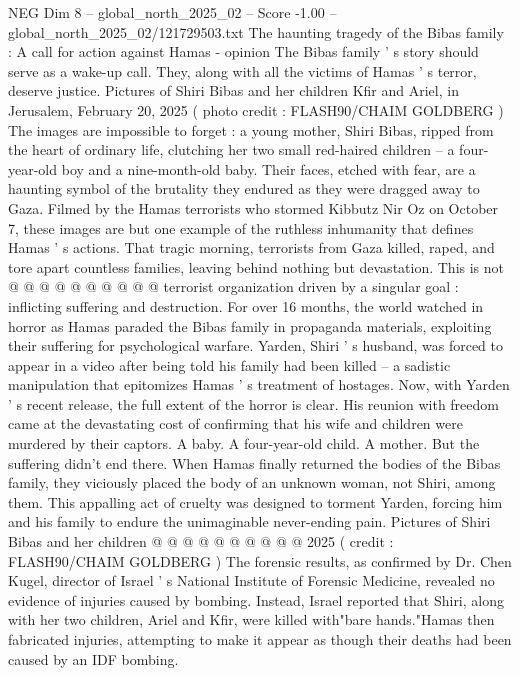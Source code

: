\begin{textsample}{NEG Dim 8 – global\_north\_2025\_02 – Score -1.00 – global\_north\_2025\_02/121729503.txt}  \label{ex:f8_neg_150}
The haunting tragedy of the Bibas family : A call for action against Hamas - opinion The Bibas family ' s story should serve as a wake-up call.
They, along with all the victims of Hamas ' s terror, deserve justice.
Pictures of Shiri Bibas and her children Kfir and Ariel, in Jerusalem, February 20, 2025 ( photo credit : FLASH90/CHAIM GOLDBERG ) The images are impossible to forget : a young mother, Shiri Bibas, ripped from the heart of ordinary life, clutching her two small red-haired children -- a four-year-old boy and a nine-month-old baby.
Their faces, etched with fear, are a haunting symbol of the brutality they endured as they were dragged away to Gaza.
Filmed by the Hamas terrorists who stormed Kibbutz Nir Oz on October 7, these images are but one example of the ruthless inhumanity that defines Hamas ' s actions.
That tragic morning, terrorists from Gaza killed, raped, and tore apart countless families, leaving behind nothing but devastation.
This is not @ @ @ @ @ @ @ @ @ @ terrorist organization driven by a singular goal : inflicting suffering and destruction.
For over 16 months, the world watched in horror as Hamas paraded the Bibas family in propaganda materials, exploiting their suffering for psychological warfare.
Yarden, Shiri ' s husband, was forced to appear in a video after being told his family had been killed -- a sadistic manipulation that epitomizes Hamas ' s treatment of hostages.
Now, with Yarden ' s recent release, the full extent of the horror is clear.
His reunion with freedom came at the devastating cost of confirming that his wife and children were murdered by their captors.
A baby.
A four-year-old child.
A mother.
But the suffering didn't end there.
When Hamas finally returned the bodies of the Bibas family, they viciously placed the body of an unknown woman, not Shiri, among them.
This appalling act of cruelty was designed to torment Yarden, forcing him and his family to endure the unimaginable never-ending pain.
Pictures of Shiri Bibas and her children @ @ @ @ @ @ @ @ @ @ 2025 ( credit : FLASH90/CHAIM GOLDBERG ) The forensic results, as confirmed by Dr.
Chen Kugel, director of Israel ' s National Institute of Forensic Medicine, revealed no evidence of injuries caused by bombing.
Instead, Israel reported that Shiri, along with her two children, Ariel and Kfir, were killed with"bare hands."Hamas then fabricated injuries, attempting to make it appear as though their deaths had been caused by an IDF bombing.

\end{textsample}
